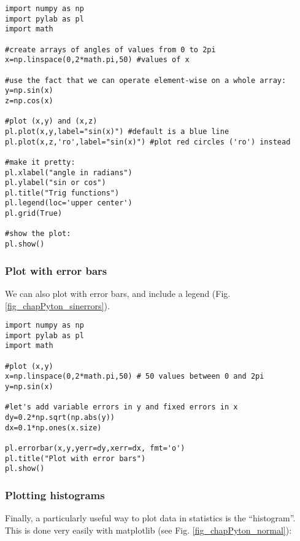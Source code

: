 \begin{lstlisting}[frame=single] 
import numpy as np
import pylab as pl
import math 

#create arrays of angles of values from 0 to 2pi
x=np.linspace(0,2*math.pi,50) #values of x

#use the fact that we can operate element-wise on a whole array:
y=np.sin(x)
z=np.cos(x)

#plot (x,y) and (x,z)
pl.plot(x,y,label="sin(x)") #default is a blue line
pl.plot(x,z,'ro',label="sin(x)") #plot red circles ('ro') instead

#make it pretty:
pl.xlabel("angle in radians")
pl.ylabel("sin or cos")
pl.title("Trig functions")
pl.legend(loc='upper center')
pl.grid(True)

#show the plot:
pl.show()

\end{lstlisting} 

\subsubsection{Plot with error bars}
We can also plot with error bars, and include a legend (Fig. \ref{fig_chapPyton_sinerrors}).

\begin{lstlisting}[frame=single] 
import numpy as np
import pylab as pl
import math 

#plot (x,y) 
x=np.linspace(0,2*math.pi,50) # 50 values between 0 and 2pi
y=np.sin(x)

#let's add variable errors in y and fixed errors in x
dy=0.2*np.sqrt(np.abs(y))
dx=0.1*np.ones(x.size)

pl.errorbar(x,y,yerr=dy,xerr=dx, fmt='o') 
pl.title("Plot with error bars")
pl.show()

\end{lstlisting} 
\subsubsection{Plotting histograms}
\label{subsub:pythonhist}
Finally, a particularly useful way to plot data in statistics is the ``histogram''. This is done very easily with matplotlib (see Fig. \ref{fig_chapPyton_normal}):

